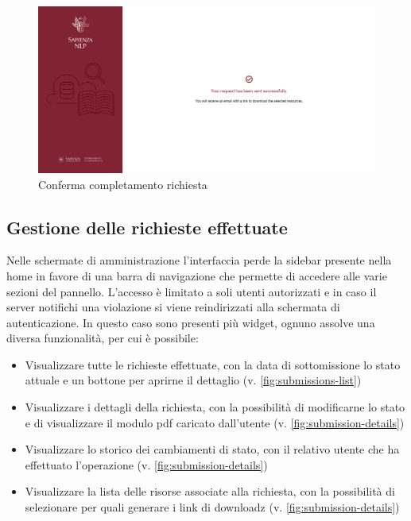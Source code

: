 \begin{figure}[H]
	\centering
	\includegraphics[width=\textwidth]{assets/ui/request-success.png}
	\caption{Conferma completamento richiesta}
	\label{fig:request-success}
\end{figure}


\subsection{Gestione delle richieste effettuate} \label{subsec:submissions-list}
Nelle schermate di amministrazione l'interfaccia perde la sidebar presente nella
home in favore di una barra di navigazione che permette di accedere alle varie
sezioni del pannello. L'accesso è limitato a soli utenti autorizzati e in caso
il server notifichi una violazione si viene reindirizzati alla schermata di
autenticazione. In questo caso sono presenti più widget, ognuno assolve una
diversa funzionalità, per cui è possibile:
\begin{itemize}
	\item Visualizzare tutte le richieste effettuate, con la data di sottomissione
	lo stato attuale e un bottone per aprirne il dettaglio (v. \autoref{fig:submissions-list})
	\item Visualizzare i dettagli della richiesta, con la possibilità di
	modificarne lo stato e di visualizzare il modulo pdf caricato dall'utente (v. \autoref{fig:submission-details})
	\item Visualizzare lo storico dei cambiamenti di stato, con il relativo utente
	che ha effettuato l'operazione (v. \autoref{fig:submission-details})
	\item Visualizzare la lista delle risorse associate alla richiesta, con la
	possibilità di selezionare per quali generare i link di downloadz (v. \autoref{fig:submission-details})
\end{itemize}

